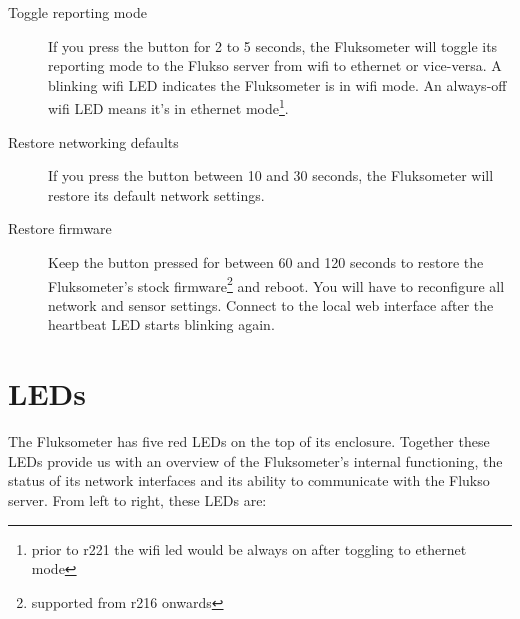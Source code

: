 \begin{description}

\item[Toggle reporting mode] If you press the button for 2 to 5 seconds, the Fluksometer will toggle its reporting mode to the Flukso server from wifi to ethernet or vice-versa. A blinking wifi LED indicates the Fluksometer is in wifi mode. An always-off wifi LED means it's in ethernet mode\footnote{prior to r221 the wifi led would be always on after toggling to ethernet mode}.
\item[Restore networking defaults] If you press the button between 10 and 30 seconds, the Fluksometer will restore its default network settings.
\item[Restore firmware] Keep the button pressed for between 60 and 120 seconds to restore the Fluksometer's stock firmware\footnote{supported from r216 onwards} and reboot. You will have to reconfigure all network and sensor settings. Connect to the local web interface after the heartbeat LED starts blinking again.
\end{description}


\section{LEDs}
The Fluksometer has five red LEDs on the top of its enclosure. Together these LEDs provide us with an overview of the Fluksometer's internal functioning, the status of its network interfaces and its ability to communicate with the Flukso server. From left to right, these LEDs are:

